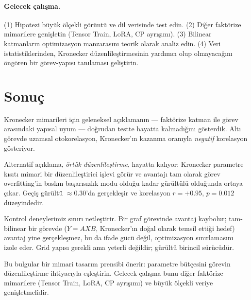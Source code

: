 \documentclass[11pt,a4paper]{article}
\begin{document}
\paragraph{Gelecek çalışma.}
(1) Hipotezi büyük ölçekli görüntü ve dil verisinde test edin.
(2) Diğer faktörize mimarilere genişletin (Tensor Train, LoRA,
CP ayrışımı). (3) Bilinear katmanların optimizasyon manzarasını
teorik olarak analiz edin. (4) Veri istatistiklerinden, Kronecker
düzenlileştirmesinin yardımcı olup olmayacağını öngören bir
görev-yapısı tanılaması geliştirin.

\section{Sonuç}
\label{sec:conclusion}

Kronecker mimarileri için geleneksel açıklamanın --- faktörize
katman ile görev arasındaki yapısal uyum --- doğrudan testte
hayatta kalmadığını gösterdik. Altı görevde uzamsal otokorelasyon,
Kronecker'ın kazanma oranıyla \emph{negatif} korelasyon gösteriyor.

Alternatif açıklama, \emph{örtük düzenlileştirme}, hayatta
kalıyor: Kronecker parametre kısıtı mimari bir düzenlileştirici
işlevi görür ve avantajı tam olarak görev overfitting'in baskın
başarısızlık modu olduğu kadar gürültülü olduğunda ortaya çıkar.
Geçiş gürültü $\approx 0.30$'da gerçekleşir ve korelasyon
$r = +0.95$, $p = 0.012$ düzeyindedir.

Kontrol deneylerimiz sınırı netleştirir. Bir graf görevinde
avantaj kaybolur; tam-bilinear bir görevde ($Y = AXB$,
Kronecker'ın doğal olarak temsil ettiği hedef) avantaj yine
gerçekleşmez, bu da ifade gücü değil, optimizasyon sınırlamasını
izole eder. Grid yapısı gerekli ama yeterli değildir; gürültü
birincil sürücüdür.

Bu bulgular bir mimari tasarım prensibi önerir: parametre
bütçesini görevin düzenlileştirme ihtiyacıyla eşleştirin.
Gelecek çalışma bunu diğer faktörize mimarilere (Tensor Train,
LoRA, CP ayrışımı) ve büyük ölçekli veriye genişletmelidir.
\end{document}
